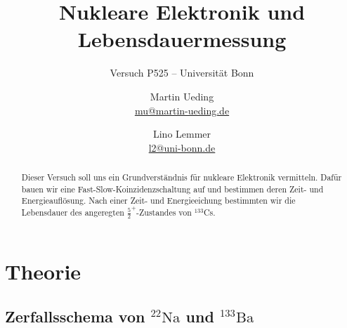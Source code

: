 

\usepackage{csquotes}

\usepackage{tikz}
\usetikzlibrary{chains}
\usetikzlibrary{shapes.geometric}


\usepackage{pgfplots}

\tikzexternalize

\usepackage{booktabs}

\hypersetup{
    pdftitle=
}

\subject{Praktikumsprotokoll}
\title{Nukleare Elektronik und Lebensdauermessung}
\subtitle{Versuch P525 -- Universität Bonn}
\author{
    Martin Ueding \\ \small{\href{mailto:mu@martin-ueding.de}{mu@martin-ueding.de}}
    \and
    Lino Lemmer \\
    \small{\href{mailto:l2@uni-bonn.de}{l2@uni-bonn.de}}
}
\publishers{Tutor: Damian-Maria Piontek}



\maketitle

\begin{abstract}
    Dieser Versuch soll uns ein Grundverständnis für nukleare Elektronik
    vermitteln. Dafür bauen wir eine Fast-Slow-Koinzidenzschaltung auf und
    bestimmen deren Zeit- und Energieauflösung. Nach einer Zeit- und
    Energieeichung bestimmten wir die Lebensdauer des angeregten
    $\frac52^+$-Zustandes von ${}^{133}$Cs.
\end{abstract}

\tableofcontents

\chapter{Theorie}

\section{Zerfallsschema von ${}^{22}\text{Na}$ und ${}^{133}\text{Ba}$}

